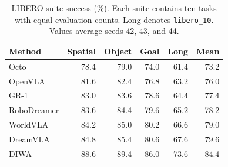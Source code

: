 \begin{table}[t]
\centering
\caption{LIBERO suite success (\%). Each suite contains ten tasks with equal evaluation counts. Long denotes \texttt{libero\_10}. Values average seeds 42, 43, and 44.}
\label{tab:libero}
\small
\begin{tabular}{lrrrrr}
\toprule
Method & Spatial & Object & Goal & Long & Mean\\
\midrule
Octo & 78.4 & 79.0 & 74.0 & 61.4 & 73.2\\
OpenVLA & 81.6 & 82.4 & 76.8 & 63.2 & 76.0\\
GR-1 & 83.0 & 83.6 & 78.6 & 64.4 & 77.4\\
RoboDreamer & 83.6 & 84.4 & 79.6 & 65.2 & 78.2\\
WorldVLA & 84.2 & 85.0 & 80.2 & 66.6 & 79.0\\
DreamVLA & 84.8 & 85.4 & 80.6 & 67.6 & 79.6\\
DIWA & 88.6 & 89.4 & 86.0 & 73.6 & 84.4\\
\bottomrule
\end{tabular}
\end{table}

